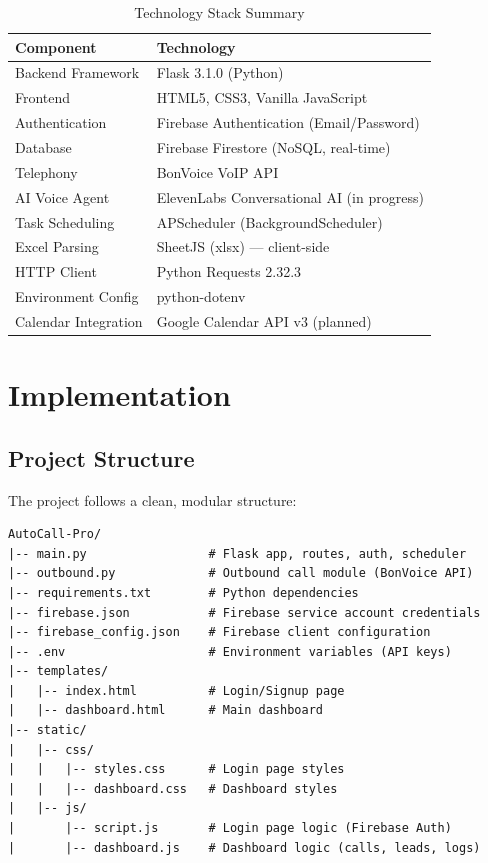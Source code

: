 \documentclass[12pt,a4paper,oneside]{book}
\begin{document}
\begin{table}[H]
\centering
\caption{Technology Stack Summary}
\label{tab:techstack}
\begin{tabularx}{\textwidth}{|l|X|}
\hline
\textbf{Component} & \textbf{Technology} \\
\hline
Backend Framework & Flask 3.1.0 (Python) \\
\hline
Frontend & HTML5, CSS3, Vanilla JavaScript \\
\hline
Authentication & Firebase Authentication (Email/Password) \\
\hline
Database & Firebase Firestore (NoSQL, real-time) \\
\hline
Telephony & BonVoice VoIP API \\
\hline
AI Voice Agent & ElevenLabs Conversational AI (in progress) \\
\hline
Task Scheduling & APScheduler (BackgroundScheduler) \\
\hline
Excel Parsing & SheetJS (xlsx) --- client-side \\
\hline
HTTP Client & Python Requests 2.32.3 \\
\hline
Environment Config & python-dotenv \\
\hline
Calendar Integration & Google Calendar API v3 (planned) \\
\hline
\end{tabularx}
\end{table}


\chapter{Implementation}

\section{Project Structure}

The project follows a clean, modular structure:

\begin{lstlisting}[language={}, caption={Project Directory Structure}, label={lst:structure}]
AutoCall-Pro/
|-- main.py                 # Flask app, routes, auth, scheduler
|-- outbound.py             # Outbound call module (BonVoice API)
|-- requirements.txt        # Python dependencies
|-- firebase.json           # Firebase service account credentials
|-- firebase_config.json    # Firebase client configuration
|-- .env                    # Environment variables (API keys)
|-- templates/
|   |-- index.html          # Login/Signup page
|   |-- dashboard.html      # Main dashboard
|-- static/
|   |-- css/
|   |   |-- styles.css      # Login page styles
|   |   |-- dashboard.css   # Dashboard styles
|   |-- js/
|       |-- script.js       # Login page logic (Firebase Auth)
|       |-- dashboard.js    # Dashboard logic (calls, leads, logs)
\end{lstlisting}
\end{document}
